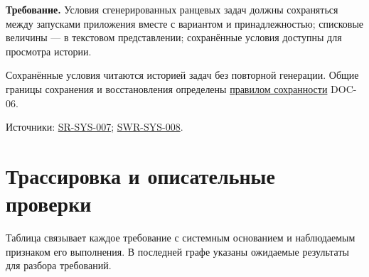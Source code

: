\documentclass[12pt,a4paper]{article}
\begin{document}
\textbf{Требование.} Условия сгенерированных ранцевых задач должны сохраняться между запусками приложения вместе с вариантом и принадлежностью; списковые величины --- в текстовом представлении; сохранённые условия доступны для просмотра истории.

Сохранённые условия читаются историей задач без повторной генерации. Общие границы сохранения и восстановления определены {\href{DOC-06\_Программные\_требования.pdf\#swr-sys-008-сохранность-завершённых-данных}{правилом сохранности}} DOC-06.

Источники: {\href{../04\_Системные\_требования/DOC-05\_Системные\_требования.pdf\#sr-sys-007}{SR-SYS-007}}; {\href{DOC-06\_Программные\_требования.pdf\#swr-sys-008}{SWR-SYS-008}}.

\section{Трассировка и описательные проверки}\label{7-ux442ux440ux430ux441ux441ux438ux440ux43eux432ux43aux430-ux438-ux43eux43fux438ux441ux430ux442ux435ux43bux44cux43dux44bux435-ux43fux440ux43eux432ux435ux440ux43aux438}

\hypertarget{7-трассировка-и-описательные-проверки}{}

Таблица связывает каждое требование с системным основанием и наблюдаемым признаком его выполнения. В последней графе указаны ожидаемые результаты для разбора требований.
\end{document}
